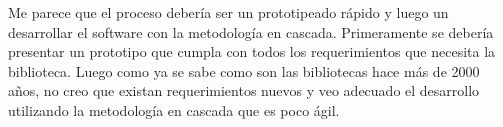 Me parece que el proceso debería ser un prototipeado rápido y luego un desarrollar el software con la metodología en cascada.
Primeramente se debería presentar un prototipo que cumpla con todos los requerimientos que necesita la biblioteca. Luego como ya se sabe como son las bibliotecas hace más de 2000 años, no creo que existan requerimientos nuevos y veo adecuado el desarrollo utilizando la metodología en cascada que es poco ágil.